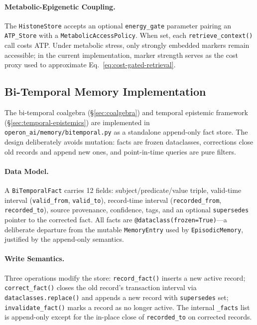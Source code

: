 \paragraph{Metabolic-Epigenetic Coupling.}
The \texttt{HistoneStore} accepts an optional \texttt{energy\_gate} parameter pairing an \texttt{ATP\_Store} with a \texttt{MetabolicAccessPolicy}. When set, each \texttt{retrieve\_context()} call costs ATP. Under metabolic stress, only strongly embedded markers remain accessible; in the current implementation, marker strength serves as the cost proxy used to approximate Eq.~\eqref{eq:cost-gated-retrieval}.

\subsection{Bi-Temporal Memory Implementation}
\label{sec:bitemporal-impl}

The bi-temporal coalgebra (\S\ref{sec:coalgebra}) and temporal epistemic framework (\S\ref{sec:temporal-epistemics}) are implemented in \texttt{operon\_ai/memory/bitemporal.py} as a standalone append-only fact store. The design deliberately avoids mutation: facts are frozen dataclasses, corrections close old records and append new ones, and point-in-time queries are pure filters.

\paragraph{Data Model.}
A \texttt{BiTemporalFact} carries 12 fields: subject/predicate/value triple, valid-time interval (\texttt{valid\_from}, \texttt{valid\_to}), record-time interval (\texttt{recorded\_from}, \texttt{recorded\_to}), source provenance, confidence, tags, and an optional \texttt{supersedes} pointer to the corrected fact. All facts are \texttt{@dataclass(frozen=True)}---a deliberate departure from the mutable \texttt{MemoryEntry} used by \texttt{EpisodicMemory}, justified by the append-only semantics.

\paragraph{Write Semantics.}
Three operations modify the store: \texttt{record\_fact()} inserts a new active record; \texttt{correct\_fact()} closes the old record's transaction interval via \texttt{dataclasses.replace()} and appends a new record with \texttt{supersedes} set; \texttt{invalidate\_fact()} marks a record as no longer active. The internal \texttt{\_facts} list is append-only except for the in-place close of \texttt{recorded\_to} on corrected records.

